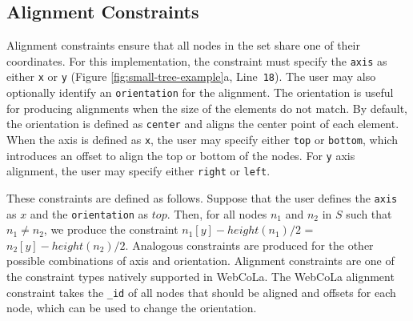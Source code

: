 \subsection{Alignment Constraints}
Alignment constraints ensure that all nodes in the set share one of their
coordinates. For this implementation, the constraint must specify the \texttt{axis}
as either \texttt{x} or \texttt{y} (Figure \ref{fig:small-tree-example}a, Line~\texttt{18}).
The user may also optionally identify an \texttt{orientation} for the alignment.
The orientation is useful for producing alignments when the size of the
elements do not match. By default, the orientation is defined as \texttt{center}
and aligns the center point of each element. When the axis is defined as \texttt{x},
the user may specify either \texttt{top} or \texttt{bottom}, which introduces
an offset to align the top or bottom of the nodes. For \texttt{y} axis
alignment, the user may specify either \texttt{right} or \texttt{left}.

These constraints are defined as follows.  Suppose that
the user defines the \texttt{axis}
as $x$ and the \texttt{orientation} as $top$.  Then, for all
nodes $n_1$ and $n_2$ in $S$
such that $n_1 \neq n_2$, we produce the constraint
$n_1[y] - height(n_1)/2$ = $n_2[y] - height(n_2)/2$.  Analogous constraints
are produced for the other possible combinations of axis and orientation.
Alignment constraints are one of the constraint types natively supported in
WebCoLa. The WebCoLa alignment constraint takes the \texttt{\_id} of all nodes
that should be aligned and offsets for each node, which can be used to change the orientation.



